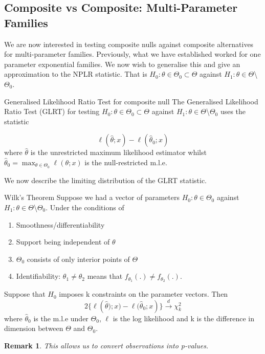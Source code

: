 \documentclass[twoside]{article}
\newtheorem{remark}[theorem]{Remark}
\begin{document}
\subsection{Composite vs Composite: Multi-Parameter Families}
We are now interested in testing composite nulls against composite alternatives for multi-parameter families. Previously, what we have established worked for one parameter exponential families. We now wish to generalise this and give an approximation to the NPLR statistic. That is $H_0: \theta \in \Theta_0 \subset \Theta$ against $H_1: \theta \in \Theta$\textbackslash $\Theta_0$. 

\begin{definition_exam}{Generalised Likelihood Ratio Test for composite null}{} The Generalised Likelihood Ratio Test (GLRT) for testing $H_0: \theta \in \Theta_0 \subset \Theta$ against $H_1: \theta \in \Theta$\textbackslash $\Theta_0$ uses the statistic 

$$
\ell(\hat{\theta}; x) - \ell(\hat{\theta}_0; x)
$$
where $\hat{\theta}$ is the unrestricted maximum likelihood estimator whilst $\hat{\theta}_{0} = \max_{\theta \in \Theta_0}\ell(\theta;x)$ is the null-restricted m.l.e. 
\end{definition_exam}

We now describe the limiting distribution of the GLRT statistic.

\begin{theorem_exam}{Wilk's Theorem}{} Suppose we had a vector of parameters $H_0: \theta \in \Theta_0$ against $H_1: \theta \in \Theta$\textbackslash $\Theta_0.$ Under the conditions of 
\begin{enumerate}
\item Smoothness/differentiability
\item Support being independent of $\theta$
\item $\Theta_0$ consists of only interior points of $\Theta$
\item Identifiability: $\theta_1 \neq \theta_2$ means that $f_{\theta_{1}}(.) \neq f_{\theta_{2}}(.)$.
\end{enumerate}
Suppose that $H_0$ imposes k constraints on the parameter vectors. Then 
$$
2\{\ell({\hat{\theta}); x) - \ell(\hat{\theta}_0}; x)\} \xrightarrow{d} \chi_{k}^{2}
$$
where $\hat{\theta}_0$ is the m.l.e under $\Theta_0$, $\ell$ is the log likelihood and k is the difference in dimension between $\Theta$ and $\Theta_0.$
\end{theorem_exam}

\begin{remark}This allows us to convert observations into p-values.
\end{remark}
\end{document}
